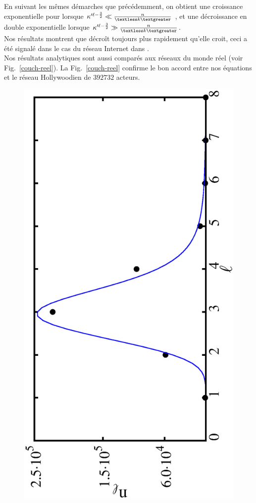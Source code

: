 En suivant les mêmes démarches que précédemment, on obtient une croissance exponentielle pour \nl lorsque $\kappa'^{\ell-\frac{3}{2}} \ll \frac{n}{\km}$ , et une décroissance en double exponentielle lorsque $\kappa'^{\ell-\frac{3}{2}} \gg \frac{n}{\km}$.\\
Nos résultats montrent que \nl décroît toujours plus rapidement qu'elle croit, ceci a été signalé dans le cas du réseau Internet dans \cite{Kalisky-al2006}.\\
Nos résultats analytiques sont aussi comparés aux réseaux du monde réel (voir Fig.~\ref{couch-reel}). La Fig.~\ref{couch-reel} confirme le bon accord  entre nos équations et le réseau Hollywoodien de $392732$ acteurs.  

\begin{figure}[h!]
	\centering
	\includegraphics[scale=0.4,angle=-90]{./figures/bacon}

\end{figure}
